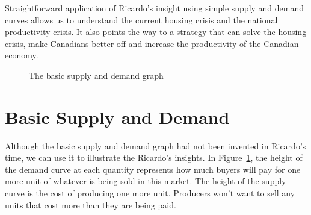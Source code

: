 Straightforward application of Ricardo's insight using simple supply and demand curves allows us to understand the current housing crisis and the national productivity crisis. It also points the way to a strategy that can solve the housing crisis, make Canadians better off and increase the productivity of the Canadian economy.


\begin{figure}[htbp]
\begin{center}
\caption{The basic supply and demand graph}
\label{fig:city_supply_and_demand}
\end{center}
\end{figure}

\section{Basic Supply and Demand}
Although the basic supply and demand graph had not been invented in Ricardo's time, we can use it to illustrate the Ricardo's insights. In Figure~\ref{fig:city_supply_and_demand}, the height of the demand curve at each quantity represents how much buyers will pay for  one more unit of whatever is being sold in this market. The height of the supply curve is the cost of producing one more unit. Producers won't want to sell any units that cost more than they are being paid.

